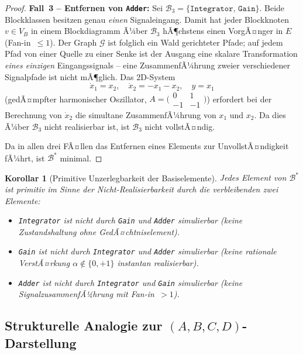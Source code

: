 ﻿\documentclass[12pt,a4paper]{article}
\newtheorem{korollar}[theorem]{Korollar}
\theoremstyle{definition}
\begin{document}
\begin{proof}
\medskip
\textbf{Fall~3 -- Entfernen von \texttt{Adder}:}
Sei $\mathcal{B}_3 = \{\texttt{Integrator},\,\texttt{Gain}\}$. Beide
Blockklassen besitzen genau \emph{einen} Signaleingang. Damit hat jeder
Blockknoten $v \in V_B$ in einem Blockdiagramm Ã¼ber $\mathcal{B}_3$
hÃ¶chstens einen VorgÃ¤nger in $E$ (Fan-in~$\leq 1$). Der Graph
$\mathcal{G}$ ist folglich ein Wald gerichteter Pfade; auf jedem Pfad
von einer Quelle zu einer Senke ist der Ausgang eine skalare Transformation
\emph{eines einzigen} Eingangssignals -- eine ZusammenfÃ¼hrung zweier
verschiedener Signalpfade ist nicht mÃ¶glich. Das 2D-System
\[
  \dot{x}_1 = x_2,\quad
  \dot{x}_2 = -x_1 - x_2,\quad
  y = x_1
\]
(gedÃ¤mpfter harmonischer Oszillator,
$A = \bigl(\begin{smallmatrix}0&1\\-1&-1\end{smallmatrix}\bigr)$)
erfordert bei der Berechnung von $\dot{x}_2$ die simultane ZusammenfÃ¼hrung
von $x_1$ und $x_2$. Da dies Ã¼ber $\mathcal{B}_3$ nicht realisierbar ist,
ist $\mathcal{B}_3$ nicht vollstÃ¤ndig.

\medskip
Da in allen drei FÃ¤llen das Entfernen eines Elements zur UnvollstÃ¤ndigkeit
fÃ¼hrt, ist $\mathcal{B}^*$ minimal.
\end{proof}

\begin{korollar}[Primitive Unzerlegbarkeit der Basiselemente]
\label{kor:unzerlegbar}
Jedes Element von $\mathcal{B}^*$ ist \emph{primitiv} im Sinne der
Nicht-Realisierbarkeit durch die verbleibenden zwei Elemente:
\begin{itemize}[nosep]
  \item \texttt{Integrator} ist nicht durch \texttt{Gain} und \texttt{Adder}
        simulierbar (keine Zustandshaltung ohne GedÃ¤chtniselement).
  \item \texttt{Gain} ist nicht durch \texttt{Integrator} und \texttt{Adder}
        simulierbar (keine rationale VerstÃ¤rkung $\alpha \notin \{0,+1\}$
        instantan realisierbar).
  \item \texttt{Adder} ist nicht durch \texttt{Integrator} und \texttt{Gain}
        simulierbar (keine SignalzusammenfÃ¼hrung mit Fan-in~$> 1$).
\end{itemize}
\end{korollar}

\subsection{Strukturelle Analogie zur $(A, B, C, D)$-Darstellung}
\end{document}
